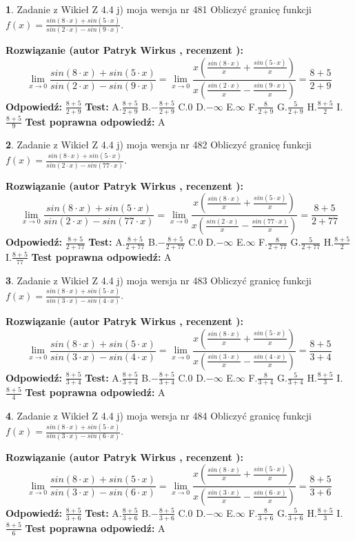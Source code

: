 \documentclass[12pt, a4paper]{article}
\theoremstyle{definition} %
\newtheorem{zad}{}
\newcommand{\zadStart}[1]{\begin{zad}#1\newline}
\newcommand{\zadStop}{\end{zad}}
\newcommand{\rozwStart}[2]{\noindent \textbf{Rozwiązanie (autor #1 , recenzent #2): }\newline}
\newcommand{\rozwStop}{\newline}
\newcommand{\odpStart}{\noindent \textbf{Odpowiedź:}\newline}
\newcommand{\odpStop}{\newline}
\newcommand{\testStart}{\noindent \textbf{Test:}\newline}
\newcommand{\testStop}{\newline}
\newcommand{\kluczStart}{\noindent \textbf{Test poprawna odpowiedź:}\newline}
\newcommand{\kluczStop}{\newline}
\begin{document}
\zadStart{Zadanie z Wikieł Z 4.4 j) moja wersja nr 481}
Obliczyć granicę funkcji $f(x)=\frac{sin(8\cdot x) +sin(5\cdot x)}{sin(2\cdot x) -sin(9\cdot x)}$.
\zadStop
\rozwStart{Patryk Wirkus}{}
$$\lim\limits_{x\to 0}\frac{sin(8\cdot x) +sin(5\cdot x)}{sin(2\cdot x) -sin(9\cdot x)}=\lim\limits_{x\to 0}\frac{x(\frac{sin(8\cdot x)}{x}+\frac{sin(5\cdot x)}{x})}{x(\frac{sin(2\cdot x)}{x}-\frac{sin(9\cdot x)}{x})}=\frac{8+5}{2+9}$$
\rozwStop
\odpStart
$\frac{8+5}{2+9}$
\odpStop
\testStart
A.$\frac{8+5}{2+9}$
B.$-\frac{8+5}{2+9}$
C.$0$
D.$-\infty$
E.$\infty$
F.$\frac{8}{2+9}$
G.$\frac{5}{2+9}$
H.$\frac{8+5}{2}$
I.$\frac{8+5}{9}$
\testStop
\kluczStart
A
\kluczStop



\zadStart{Zadanie z Wikieł Z 4.4 j) moja wersja nr 482}
Obliczyć granicę funkcji $f(x)=\frac{sin(8\cdot x) +sin(5\cdot x)}{sin(2\cdot x) -sin(77\cdot x)}$.
\zadStop
\rozwStart{Patryk Wirkus}{}
$$\lim\limits_{x\to 0}\frac{sin(8\cdot x) +sin(5\cdot x)}{sin(2\cdot x) -sin(77\cdot x)}=\lim\limits_{x\to 0}\frac{x(\frac{sin(8\cdot x)}{x}+\frac{sin(5\cdot x)}{x})}{x(\frac{sin(2\cdot x)}{x}-\frac{sin(77\cdot x)}{x})}=\frac{8+5}{2+77}$$
\rozwStop
\odpStart
$\frac{8+5}{2+77}$
\odpStop
\testStart
A.$\frac{8+5}{2+77}$
B.$-\frac{8+5}{2+77}$
C.$0$
D.$-\infty$
E.$\infty$
F.$\frac{8}{2+77}$
G.$\frac{5}{2+77}$
H.$\frac{8+5}{2}$
I.$\frac{8+5}{77}$
\testStop
\kluczStart
A
\kluczStop



\zadStart{Zadanie z Wikieł Z 4.4 j) moja wersja nr 483}
Obliczyć granicę funkcji $f(x)=\frac{sin(8\cdot x) +sin(5\cdot x)}{sin(3\cdot x) -sin(4\cdot x)}$.
\zadStop
\rozwStart{Patryk Wirkus}{}
$$\lim\limits_{x\to 0}\frac{sin(8\cdot x) +sin(5\cdot x)}{sin(3\cdot x) -sin(4\cdot x)}=\lim\limits_{x\to 0}\frac{x(\frac{sin(8\cdot x)}{x}+\frac{sin(5\cdot x)}{x})}{x(\frac{sin(3\cdot x)}{x}-\frac{sin(4\cdot x)}{x})}=\frac{8+5}{3+4}$$
\rozwStop
\odpStart
$\frac{8+5}{3+4}$
\odpStop
\testStart
A.$\frac{8+5}{3+4}$
B.$-\frac{8+5}{3+4}$
C.$0$
D.$-\infty$
E.$\infty$
F.$\frac{8}{3+4}$
G.$\frac{5}{3+4}$
H.$\frac{8+5}{3}$
I.$\frac{8+5}{4}$
\testStop
\kluczStart
A
\kluczStop



\zadStart{Zadanie z Wikieł Z 4.4 j) moja wersja nr 484}
Obliczyć granicę funkcji $f(x)=\frac{sin(8\cdot x) +sin(5\cdot x)}{sin(3\cdot x) -sin(6\cdot x)}$.
\zadStop
\rozwStart{Patryk Wirkus}{}
$$\lim\limits_{x\to 0}\frac{sin(8\cdot x) +sin(5\cdot x)}{sin(3\cdot x) -sin(6\cdot x)}=\lim\limits_{x\to 0}\frac{x(\frac{sin(8\cdot x)}{x}+\frac{sin(5\cdot x)}{x})}{x(\frac{sin(3\cdot x)}{x}-\frac{sin(6\cdot x)}{x})}=\frac{8+5}{3+6}$$
\rozwStop
\odpStart
$\frac{8+5}{3+6}$
\odpStop
\testStart
A.$\frac{8+5}{3+6}$
B.$-\frac{8+5}{3+6}$
C.$0$
D.$-\infty$
E.$\infty$
F.$\frac{8}{3+6}$
G.$\frac{5}{3+6}$
H.$\frac{8+5}{3}$
I.$\frac{8+5}{6}$
\testStop
\kluczStart
A
\kluczStop
\end{document}
